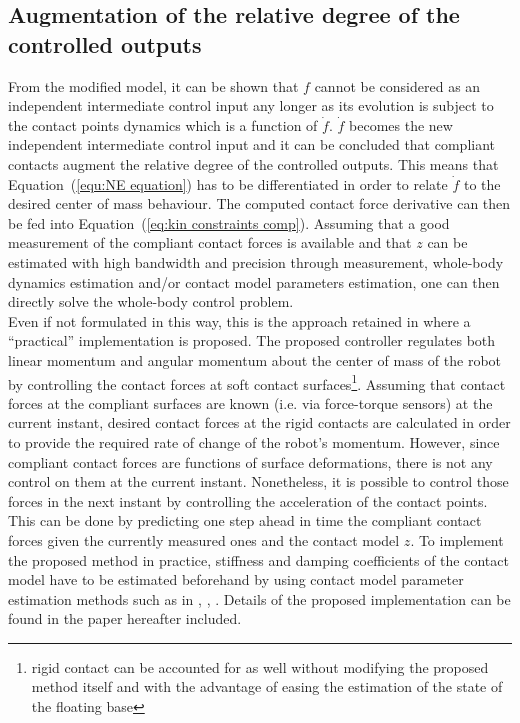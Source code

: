 \documentclass[12pt,a4paper,twoside]{article}
\begin{document}
\subsection{Augmentation of the relative degree of the controlled outputs}

From the modified model, it can be shown that $f$ cannot be considered as an independent intermediate control input any longer as its evolution is subject to the contact points dynamics which is a function of $\dot{f}$. $\dot{f}$ becomes the new independent intermediate control input and it can be concluded that compliant contacts augment the relative degree of the controlled outputs. This means that Equation~(\ref{equ:NE equation}) has to be differentiated in order to relate $\dot{f}$ to the desired center of mass behaviour. The computed contact force derivative can then be fed into Equation~(\ref{eq:kin constraints comp}). Assuming that a good measurement of the compliant contact forces is available and that $z$ can be estimated with high bandwidth and precision through measurement, whole-body dynamics estimation and/or contact model parameters estimation, one can then directly solve the whole-body control problem.\\

Even if not formulated in this way, this is the approach retained in \cite{AzadIROS2015} where a ``practical'' implementation is proposed. The proposed controller regulates both linear momentum and angular momentum about the center of mass of the robot by controlling the contact forces at soft contact surfaces\footnote{rigid contact can be accounted for as well without modifying the proposed method itself and with the advantage of easing the estimation of the state of the floating base}. Assuming that contact forces at the compliant surfaces are known (i.e. via force-torque sensors) at the current instant, desired contact forces at the rigid contacts are calculated in order to provide the required rate of change of the robot's momentum.  However, since compliant contact forces are functions of surface deformations, there is not  any control on them at the current instant. Nonetheless, it is possible to control those forces in the next instant by controlling the acceleration of the contact points.  This can be done by predicting one step ahead in time the compliant contact forces given the currently measured ones and the contact model $z$. To implement the proposed method in practice, stiffness and damping coefficients of the contact model have to be estimated beforehand by using contact model parameter estimation methods such as in \cite{Dallalietal13}, \cite{Diolaitietal05}, \cite{Ericksonetal03}. Details of the proposed implementation can be found in the paper hereafter included.
\end{document}
